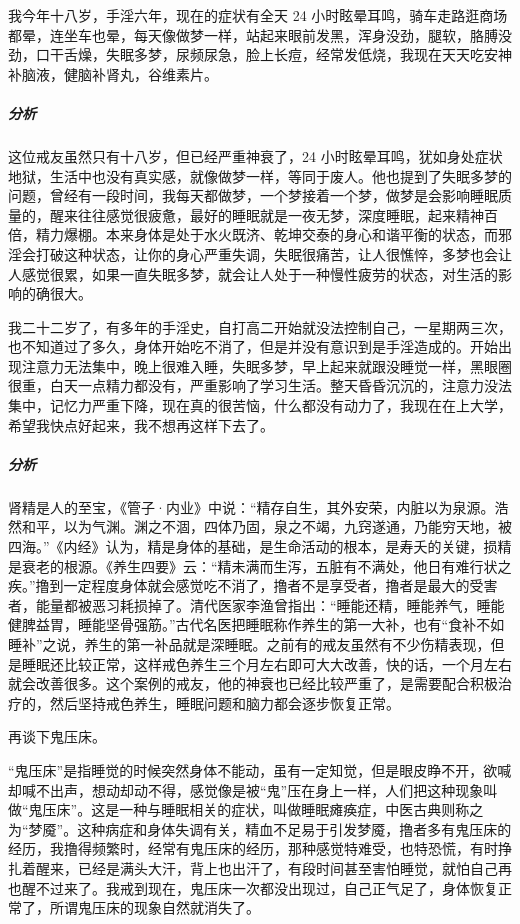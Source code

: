 \begin{case}
    我今年十八岁，手淫六年，现在的症状有全天 24 小时眩晕耳鸣，骑车走路逛商场都晕，连坐车也晕，每天像做梦一样，站起来眼前发黑，浑身没劲，腿软，胳膊没劲，口干舌燥，失眠多梦，尿频尿急，脸上长痘，经常发低烧，我现在天天吃安神补脑液，健脑补肾丸，谷维素片。
    \subparagraph{分析} 这位戒友虽然只有十八岁，但已经严重神衰了，24 小时眩晕耳鸣，犹如身处症状地狱，生活中也没有真实感，就像做梦一样，等同于废人。他也提到了失眠多梦的问题，曾经有一段时间，我每天都做梦，一个梦接着一个梦，做梦是会影响睡眠质量的，醒来往往感觉很疲惫，最好的睡眠就是一夜无梦，深度睡眠，起来精神百倍，精力爆棚。本来身体是处于水火既济、乾坤交泰的身心和谐平衡的状态，而邪淫会打破这种状态，让你的身心严重失调，失眠很痛苦，让人很憔悴，多梦也会让人感觉很累，如果一直失眠多梦，就会让人处于一种慢性疲劳的状态，对生活的影响的确很大。
\end{case}

\begin{case}
    我二十二岁了，有多年的手淫史，自打高二开始就没法控制自己，一星期两三次，也不知道过了多久，身体开始吃不消了，但是并没有意识到是手淫造成的。开始出现注意力无法集中，晚上很难入睡，失眠多梦，早上起来就跟没睡觉一样，黑眼圈很重，白天一点精力都没有，严重影响了学习生活。整天昏昏沉沉的，注意力没法集中，记忆力严重下降，现在真的很苦恼，什么都没有动力了，我现在在上大学，希望我快点好起来，我不想再这样下去了。
    \subparagraph{分析} 肾精是人的至宝，《管子·内业》中说：“精存自生，其外安荣，内脏以为泉源。浩然和平，以为气渊。渊之不涸，四体乃固，泉之不竭，九窍遂通，乃能穷天地，被四海。”《内经》认为，精是身体的基础，是生命活动的根本，是寿夭的关键，损精是衰老的根源。《养生四要》云：“精未满而生泻，五脏有不满处，他日有难行状之疾。”撸到一定程度身体就会感觉吃不消了，撸者不是享受者，撸者是最大的受害者，能量都被恶习耗损掉了。清代医家李渔曾指出：“睡能还精，睡能养气，睡能健脾益胃，睡能坚骨强筋。”古代名医把睡眠称作养生的第一大补，也有“食补不如睡补”之说，养生的第一补品就是深睡眠。之前有的戒友虽然有不少伤精表现，但是睡眠还比较正常，这样戒色养生三个月左右即可大大改善，快的话，一个月左右就会改善很多。这个案例的戒友，他的神衰也已经比较严重了，是需要配合积极治疗的，然后坚持戒色养生，睡眠问题和脑力都会逐步恢复正常。
\end{case}

再谈下鬼压床。

“鬼压床”是指睡觉的时候突然身体不能动，虽有一定知觉，但是眼皮睁不开，欲喊却喊不出声，想动却动不得，感觉像是被“鬼”压在身上一样，人们把这种现象叫做“鬼压床”。这是一种与睡眠相关的症状，叫做睡眠瘫痪症，中医古典则称之为“梦魇”。这种病症和身体失调有关，精血不足易于引发梦魇，撸者多有鬼压床的经历，我撸得频繁时，经常有鬼压床的经历，那种感觉特难受，也特恐慌，有时挣扎着醒来，已经是满头大汗，背上也出汗了，有段时间甚至害怕睡觉，就怕自己再也醒不过来了。我戒到现在，鬼压床一次都没出现过，自己正气足了，身体恢复正常了，所谓鬼压床的现象自然就消失了。

